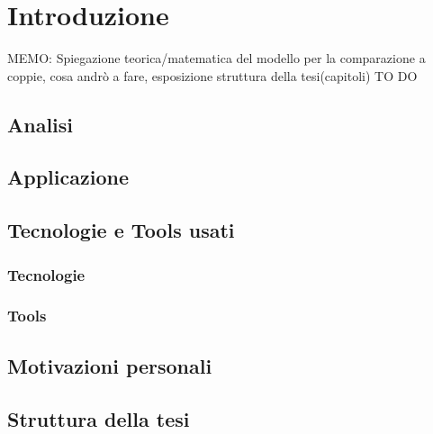 
\chapter{Introduzione}
\label{cap:introduzione}
MEMO: Spiegazione teorica/matematica del modello per la comparazione a coppie, cosa andrò a fare, esposizione struttura della tesi(capitoli) TO DO



\section{Analisi}

\section{Applicazione}

\section{Tecnologie e Tools usati}

\subsection{Tecnologie}

\subsection{Tools}

\section{Motivazioni personali}

\section{Struttura della tesi}






\begin{comment}
\begin{figure}[h]
	\begin{center}
		\texttt{[image: Logo\_azzurrodigite.png]}
		\caption{Logo di AzzurroDigitale}
	\end{center}
\end{figure}	contenuto...
\end{comment}


